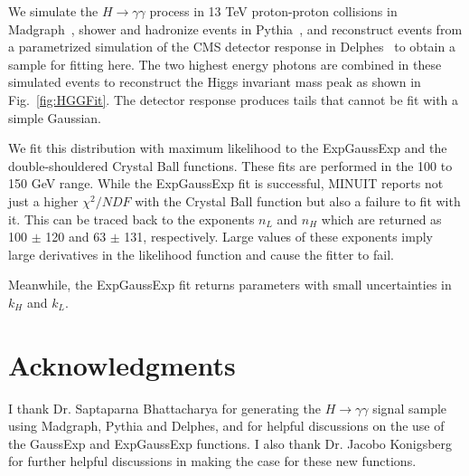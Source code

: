 \documentclass[10pt,letterpaper]{article}
\begin{document}
We simulate the $H\to\gamma\gamma$ process in 13 TeV proton-proton collisions in Madgraph~\cite{Alwall:2011uj}, shower and hadronize events in Pythia~\cite{PYTHIA}, and reconstruct events from a parametrized simulation of the CMS detector response in Delphes~\cite{deFavereau:2013fsa} to obtain a sample for fitting here. The two highest energy photons are combined in these simulated events to reconstruct the Higgs invariant mass peak as shown in Fig.~\ref{fig:HGGFit}. The detector response produces tails that cannot be fit with a simple Gaussian.

We fit this distribution with maximum likelihood to the ExpGaussExp and the double-shouldered Crystal Ball functions. These fits are performed in the 100 to 150 GeV range. While the ExpGaussExp fit is successful, MINUIT reports not just a higher $\chi^2/NDF$ with the Crystal Ball function but also a failure to fit with it. This can be traced back to the exponents $n_L$ and $n_H$ which are returned as 100 $\pm$ 120 and 63 $\pm$ 131, respectively. Large values of these exponents imply large derivatives in the likelihood function and cause the fitter to fail. 

Meanwhile, the ExpGaussExp fit returns parameters with small uncertainties in $k_H$ and $k_L$.

\section*{Acknowledgments}

I thank Dr. Saptaparna Bhattacharya for generating the $H\to\gamma\gamma$ signal sample using Madgraph, Pythia and Delphes, and for helpful discussions on the use of the GaussExp and ExpGaussExp functions. I also thank Dr. Jacobo Konigsberg for further helpful discussions in making the case for these new functions.



\end{document}

